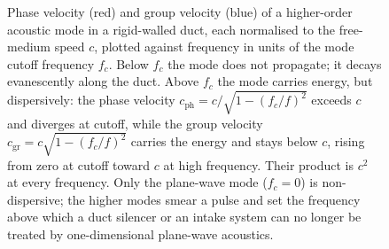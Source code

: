 \begin{figure}[htbp]
\centering
{}
\caption[Duct-mode dispersion above cutoff]{Phase velocity (red) and
group velocity (blue) of a higher-order acoustic mode in a rigid-walled
duct, each normalised to the free-medium speed $c$, plotted against
frequency in units of the mode cutoff frequency $f_c$. Below $f_c$ the
mode does not propagate; it decays evanescently along the duct. Above
$f_c$ the mode carries energy, but dispersively: the phase velocity
$c_{\mathrm{ph}}=c/\sqrt{1-(f_c/f)^2}$ exceeds $c$ and diverges at
cutoff, while the group velocity $c_{\mathrm{gr}}=c\sqrt{1-(f_c/f)^2}$
carries the energy and stays below $c$, rising from zero at cutoff toward
$c$ at high frequency. Their product is $c^2$ at every frequency. Only
the plane-wave mode ($f_c=0$) is non-dispersive; the higher modes smear
a pulse and set the frequency above which a duct silencer or an
intake system can no longer be treated by one-dimensional plane-wave
acoustics.}
\label{fig:vol03ch07:duct-cutoff}
\end{figure}
